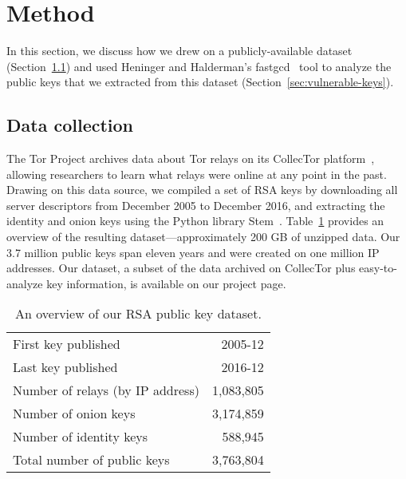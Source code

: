\section{Method}
\label{sec:method}
In this section, we discuss how we drew on a publicly-available dataset
(Section~\ref{sec:data-collection}) and used Heninger and Halderman's 
fastgcd~\cite{fastgcd} tool to analyze the public keys that 
we extracted from this dataset (Section~\ref{sec:vulnerable-keys}).

\subsection{Data collection}
\label{sec:data-collection}
The Tor Project archives data about Tor relays on its CollecTor
platform~\cite{collector}, allowing researchers to learn what relays were online
at any point in the past.  Drawing on this data source, we compiled a set of RSA
keys by downloading all server descriptors from December 2005 to December 2016,
and extracting the identity and onion keys using the Python
library Stem~\cite{stem}.  Table~\ref{tab:dataset} provides an overview of the
resulting dataset---approximately 200 GB of unzipped data.  Our 3.7 million
public keys span eleven years and were created on one million IP addresses.
Our dataset, a subset of the data archived on CollecTor plus
easy-to-analyze key information, is available on our project page.

\begin{table}[t]
	\centering
	\begin{tabular}{l r}
	\toprule

	First key published & 2005-12 \\
	Last key published & 2016-12 \\

	\midrule

	Number of relays (by IP address) & 1,083,805 \\
	Number of onion keys & 3,174,859 \\
	Number of identity keys & 588,945 \\
	Total number of public keys & 3,763,804 \\

	\bottomrule
	\end{tabular}
	\caption{An overview of our RSA public key dataset.}
	\label{tab:dataset}
\end{table}

